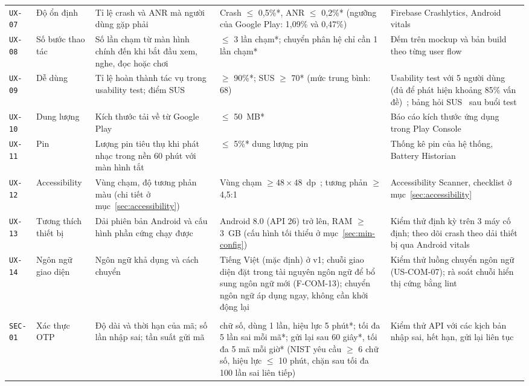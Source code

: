 \begin{longtable}{@{}>{\raggedright\arraybackslash}p{1.2cm}>{\raggedright\arraybackslash}p{2.4cm}>{\raggedright\arraybackslash}p{4.2cm}>{\raggedright\arraybackslash}p{3.7cm}>{\raggedright\arraybackslash}p{3.5cm}@{}}
\texttt{UX-07} & Độ ổn định & Tỉ lệ crash và ANR mà người dùng gặp phải & Crash $\le$ 0,5\%*, ANR $\le$ 0,2\%* (ngưỡng của Google Play: 1,09\% và 0,47\%)~\cite{android-vitals} & Firebase Crashlytics, Android vitals \\
\texttt{UX-08} & Số bước thao tác & Số lần chạm từ màn hình chính đến khi bắt đầu xem, nghe, đọc hoặc chơi & $\le$ 3 lần chạm*; chuyển phân hệ chỉ cần 1 lần chạm* & Đếm trên mockup và bản build theo từng user flow \\
\texttt{UX-09} & Dễ dùng & Tỉ lệ hoàn thành tác vụ trong usability test; điểm SUS & $\ge$ 90\%*; SUS $\ge$ 70* (mức trung bình: 68)~\cite{sauro2011sus} & Usability test với 5 người dùng (đủ để phát hiện khoảng 85\% vấn đề)~\cite{nielsen-five-users}; bảng hỏi SUS~\cite{brooke1996sus} sau buổi test \\
\texttt{UX-10} & Dung lượng & Kích thước tải về từ Google Play & $\le$ 50~MB* & Báo cáo kích thước ứng dụng trong Play Console \\
\texttt{UX-11} & Pin & Lượng pin tiêu thụ khi phát nhạc trong nền 60 phút với màn hình tắt & $\le$ 5\%* dung lượng pin & Thống kê pin của hệ thống, Battery Historian \\
\texttt{UX-12} & Accessibility & Vùng chạm, độ tương phản màu (chi tiết ở mục~\ref{sec:accessibility}) & Vùng chạm $\ge 48 \times 48$~dp~\cite{android-accessibility}; tương phản $\ge$ 4,5:1~\cite{wcag22} & Accessibility Scanner, checklist ở mục~\ref{sec:accessibility} \\
\texttt{UX-13} & Tương thích thiết bị & Dải phiên bản Android và cấu hình phần cứng chạy được & Android 8.0 (API 26) trở lên, RAM $\ge$ 3~GB (cấu hình tối thiểu ở mục~\ref{sec:min-config}) & Kiểm thử định kỳ trên 3 máy cố định; theo dõi crash theo dải thiết bị qua Android vitals \\
\texttt{UX-14} & Ngôn ngữ giao diện & Ngôn ngữ khả dụng và cách chuyển & Tiếng Việt (mặc định) ở v1; chuỗi giao diện đặt trong tài nguyên ngôn ngữ để bổ sung ngôn ngữ mới (F-COM-13); chuyển ngôn ngữ áp dụng ngay, không cần khởi động lại & Kiểm thử luồng chuyển ngôn ngữ (US-COM-07); rà soát chuỗi hiển thị cứng bằng lint \\
\midrule
\multicolumn{5}{@{}l}{\textit{Security \& Privacy}} \\
\texttt{SEC-01} & Xác thực OTP & Độ dài và thời hạn của mã; số lần nhập sai; tần suất gửi mã & 6 chữ số, dùng 1 lần, hiệu lực 5 phút*; tối đa 5 lần sai mỗi mã*; gửi lại sau 60 giây*, tối đa 5 mã mỗi giờ* (NIST yêu cầu $\ge$ 6 chữ số, hiệu lực $\le$ 10 phút, chặn sau tối đa 100 lần sai liên tiếp)~\cite{nist80063b4} & Kiểm thử API với các kịch bản nhập sai, hết hạn, gửi lại liên tục \\

\end{longtable}
